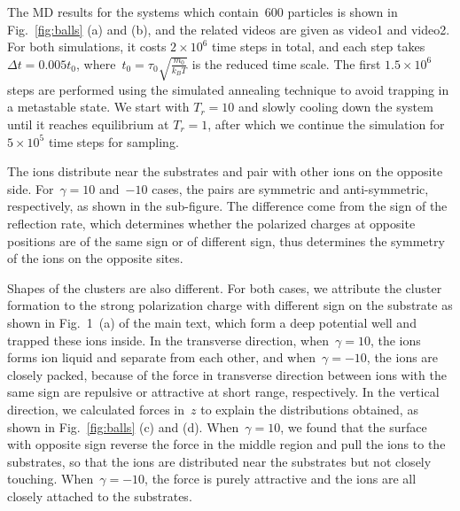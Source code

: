 The MD results for the systems which contain~$600$ particles is shown in Fig.~\ref{fig:balls} (a) and (b), and the related videos are given as video1 and video2.
For both simulations, it costs $2 \times 10^6$ time steps in total, and each step takes~$\Delta t = 0.005 t_0$, where~$t_0 = \tau_0 \sqrt{\frac{m_0}{k_B T}}$ is the reduced time scale.
The first $1.5\times 10^6$ steps are performed using the simulated annealing technique to avoid trapping in a metastable state. We start with $T_r=10$ and slowly cooling down the system until it reaches equilibrium at $T_r=1$, after which we continue the simulation for $5 \times 10^5$ time steps for sampling.

The ions distribute near the substrates and pair with other ions on the opposite side.
For~$\gamma = 10$ and~$-10$ cases, the pairs are symmetric and anti-symmetric, respectively, as shown in the sub-figure.
The difference come from the sign of the reflection rate, which determines whether the polarized charges at opposite positions are of the same sign or of different sign, thus determines the symmetry of the ions on the opposite sites.

Shapes of the clusters are also different.
For both cases, we attribute the cluster formation to the strong polarization charge with different sign on the substrate as shown in Fig.~1~(a) of the main text, which form a deep potential well and trapped these ions inside.
In the transverse direction, when~$\gamma = 10$, the ions forms ion liquid and separate from each other, and when~$\gamma = -10$, the ions are closely packed, because of the force in transverse direction between ions with the same sign are repulsive or attractive at short range, respectively.
In the vertical direction, we calculated forces in~$z$ to explain the distributions obtained, as shown in Fig.~\ref{fig:balls} (c) and (d).
When~$\gamma = 10$, we found that the surface with opposite sign reverse the force in the middle region and pull the ions to the substrates, so that the ions are distributed near the substrates but not closely touching.
When~$\gamma = -10$, the force is purely attractive and the ions are all closely attached to the substrates.